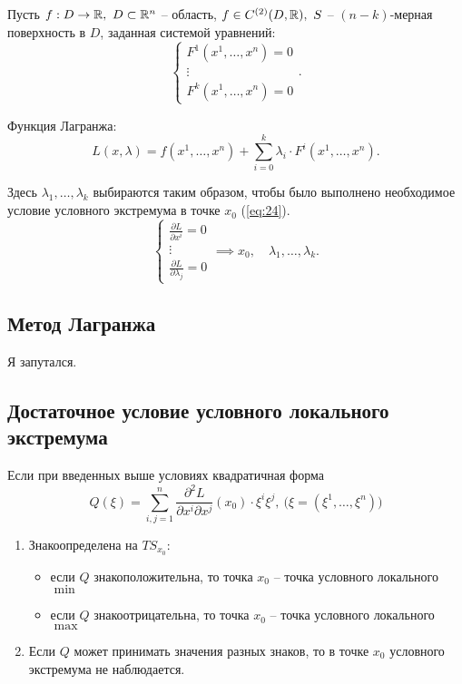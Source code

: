 \begin{note}
    Пусть $f:D\rightarrow\mathbb{R}, \ D \subset \mathbb{R}^n$ -- область, $f \in C^{(2)} (D,\mathbb{R}), \ S$ -- $(n-k)$-мерная поверхность в $D$, заданная системой уравнений:
    \[
        \left\{\begin{array}{l}
            F^1(x^1,\ldots,x^n) = 0 \\
            \vdots                  \\
            F^k(x^1,\ldots,x^n) = 0
        \end{array}\right..
    \]

    Функция Лагранжа:
    \[
        L(x,\lambda) = f(x^1,\ldots,x^n) + \sum_{i = 0}^{k}\lambda_i \cdot F^i(x^1,\ldots,x^n).
    \]

    Здесь $\lambda_1,\ldots,\lambda_k$ выбираются таким образом, чтобы было выполнено необходимое условие условного экстремума в точке $x_0$ (\ref{eq:24}).
    \[
        \left\{\begin{array}{l}
            \frac{\partial L}{\partial x^i} = 0 \\
            \vdots                          \\
            \frac{\partial L}{\partial \lambda_j} = 0
        \end{array}\right. \implies x_0,\quad \lambda_1,\ldots,\lambda_k.
    \]
\end{note}

\subsection{Метод Лагранжа}

Я запутался.

\subsection{Достаточное условие условного локального экстремума}

\begin{theorem}
    Если при введенных выше условиях квадратичная форма
    \[
        Q(\xi) = \sum_{i,j=1}^{n}\frac{\partial^2 L}{\partial x^i \partial x^j}(x_0)\cdot\xi^i\xi^j,\ \big(\xi=(\xi^1,\ldots,\xi^n)\big)
    \]
    \begin{enumerate}
        \item Знакоопределена на $TS_{x_0}$:
              \begin{itemize}
                  \item если $Q$ знакоположительна, то точка $x_0$ -- точка условного локального $\min$
                  \item если $Q$ знакоотрицательна, то точка $x_0$ -- точка условного локального $\max$
              \end{itemize}
        \item Если $Q$ может принимать значения разных знаков, то в точке $x_0$ условного экстремума не наблюдается.
    \end{enumerate}
\end{theorem}
